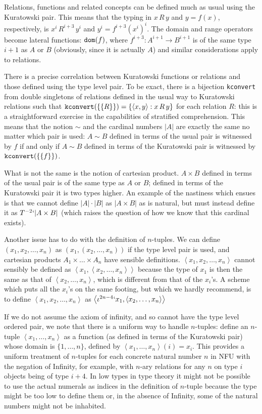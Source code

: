 \documentclass[12pt]{article}
\begin{document}
Relations, functions and related concepts can be defined much as usual using the Kuratowski pair.  This means that the typing in $x \, R \, y$ and $y = f(x)$, respectively, is $x^i\,R^{i+3}\,y^i$ and $y^i = f^{i+3}(x^i)^i$.  The domain and range operators become lateral functions:  ${\tt dom}(f)$, where $f^{i+3}:A^{i+1} \rightarrow B^{i+1}$ is of the same type $i+1$ as $A$ or $B$ (obviously, since it is actually $A$) and similar considerations apply to relations.

There is a precise correlation between Kuratowski functions or relations and those defined using the type level pair.  To be exact, there is a bijection {\tt kconvert} from double singletons of relations defined in the usual way  to Kuratowski relations such that ${\tt kconvert}(\{\{R\}\}) = \{\left<x,y\right>:x \, R\, y\}$ for each relation $R$:  this is a straightforward exercise in the capabilities of stratified comprehension.  This means that the notion $\sim$ and the cardinal numbers $|A|$ are exactly the same no matter which pair is used:  $A \sim B$ defined in terms of the usual pair is witnessed by $f$ if and only if $A \sim B$ defined in terms of the Kuratowski pair is witnessed by ${\tt kconvert}(\{\{f\}\})$.

What is not the same is the notion of cartesian product.  $A \times B$ defined in terms of the usual pair is of the same type as $A$ or $B$;  defined in terms of the Kuratowski pair it is two types higher.
An example of the nastiness which ensues is that we cannot define $|A| \cdot |B|$ as $|A \times B|$ as is natural, but must instead define it as $T^{-2}`|A \times B|$ (which raises the question of how we know that this cardinal exists).

Another issue has to do with the definition of $n$-tuples.  We can define $(x_1,x_2,\ldots,x_n)$ as $(x_1,(x_2,\ldots,x_n))$ if the type level pair is used, and cartesian products $A_1 \times \ldots \times A_n$ have sensible definitions.  $\left<x_1,x_2,\ldots,x_n\right>$ cannot sensibly be defined as $\left<x_1,\left<x_2,\ldots,x_n\right>\right>$  because the type of $x_1$ is then the same as that of $\left<x_2,\ldots,x_n\right>$,
which is different from that of the $x_i$'s.  A scheme which puts all the $x_i$'s on the same footing, but which we hardly recommend, is to define $\left<x_1,x_2,\ldots,x_n\right>$ as $\left<\iota^{2n-4}`x_1,\left<x_2,\ldots,x_n\right>\right>$

If we do not assume the axiom of infinity, and so cannot have the type level ordered pair, we note that there is a uniform way to handle $n$-tuples:  define an $n$-tuple $\left<x_1,\ldots,x_n\right>$ as a function
(as defined in terms of the Kuratowski pair) whose domain is $\{1,\ldots,n\}$, defined by $\left<x_1,\ldots,x_n\right>(i) = x_i$.  This provides a uniform treatment of $n$-tuples for each concrete natural number $n$ in NFU with the negation of Infinity, for example, with $n$-ary relations for any $n$ on type $i$ objects being of type $i+4$.  In low types in type theory  it might not be possible to use the actual numerals as indices in the definition of $n$-tuple because the type might be too low to define them or, in the absence of Infinity, some of the natural numbers might not be inhabited.
\end{document}
